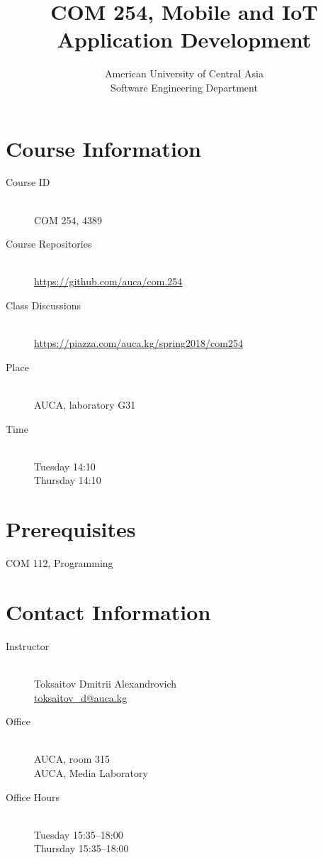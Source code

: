 \documentclass[12pt,a4paper,oneside]{article}
\newcommand{\R}[1]{\uppercase\expandafter{\romannumeral #1\relax}}
\begin{document}
    \title{COM 254, Mobile and IoT Application Development}
    \author{
        American University of Central Asia\\
        Software Engineering Department
    }
    \date{}
    \maketitle

    \section{Course Information}

        \begin{description}
            \item[Course ID]\hfill\\
                COM 254, 4389
            \item[Course Repositories]\hfill\\
                \url{https://github.com/auca/com.254}
            \item[Class Discussions]\hfill\\
                \url{https://piazza.com/auca.kg/spring2018/com254}
            \item[Place]\hfill\\
                AUCA, laboratory G31
            \item[Time]\hfill\\
                Tuesday 14:10\\
                Thursday 14:10
        \end{description}

    \section{Prerequisites}

        COM 112, Programming \R{2}

    \section{Contact Information}

        \begin{description}
            \item[Instructor]\hfill\\
                Toksaitov Dmitrii Alexandrovich\\
                \href{mailto:toksaitov_d@auca.kg}{toksaitov\_d@auca.kg}
            \item[Office]\hfill\\
                AUCA, room 315\\
                AUCA, Media Laboratory
            \item[Office Hours]\hfill\\
                Tuesday 15:35--18:00\\
                Thursday 15:35--18:00
        \end{description}
\end{document}
